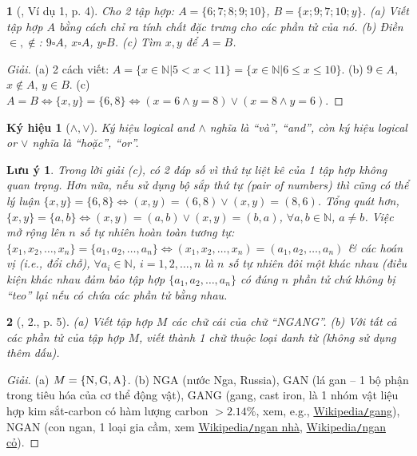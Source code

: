 \documentclass{article}
\newtheorem{baitoan}{}
\newtheorem{kyhieu}{Ký hiệu}
\newtheorem{luuy}{Lưu ý}
\begin{document}
\begin{baitoan}[\cite{Tuyen_Toan_6}, Ví dụ 1, p. 4]
	Cho 2 tập hợp: $A = \{6;7;8;9;10\}$, $B = \{x;9;7;10;y\}$. (a) Viết tập hợp $A$ bằng cách chỉ ra tính chất đặc trưng cho các phần tử của nó. (b) Điền $\in,\notin$: $9\square A$, $x\square A$, $y\square B$. (c) Tìm $x,y$ để $A = B$.
\end{baitoan}

\begin{proof}[Giải]
	(a) 2 cách viết: $A = \{x\in\mathbb{N}|5 < x < 11\} = \{x\in\mathbb{N}|6\le x\le10\}$. (b) $9\in A$, $x\notin A$, $y\in B$. (c) $A = B\Leftrightarrow\{x,y\} = \{6,8\}\Leftrightarrow(x = 6\land y = 8)\lor(x = 8\land y = 6)$.
\end{proof}

\begin{kyhieu}[$\land,\lor$]
	Ký hiệu logical and $\land$ nghĩa là ``và'', ``and'', còn ký hiệu logical or $\lor$ nghĩa là ``hoặc'', ``or''.
\end{kyhieu}

\begin{luuy}
	Trong lời giải (c), có 2 đáp số vì thứ tự liệt kê của 1 tập hợp không quan trọng. Hơn nữa, nếu sử dụng bộ sắp thứ tự (pair of numbers) thì cũng có thể lý luận $\{x,y\} = \{6,8\}\Leftrightarrow(x,y) = (6,8)\lor(x,y) = (8,6)$. Tổng quát hơn, $\{x,y\} = \{a,b\}\Leftrightarrow(x,y) = (a,b)\lor(x,y) = (b,a)$, $\forall a,b\in\mathbb{N}$, $a\ne b$. Việc mở rộng lên $n$ số tự nhiên hoàn toàn tương tự: $\{x_1,x_2,\ldots,x_n\} = \{a_1,a_2,\ldots,a_n\}\Leftrightarrow(x_1,x_2,\ldots,x_n) = (a_1,a_2,\ldots,a_n)$ \& các hoán vị (i.e., đổi chỗ), $\forall a_i\in\mathbb{N}$, $i = 1,2,\ldots,n$ là $n$ số tự nhiên đôi một khác nhau (điều kiện khác nhau đảm bảo tập hợp $\{a_1,a_2,\ldots,a_n\}$ có đúng $n$ phần tử chứ không bị ``teo'' lại nếu có chứa các phần tử bằng nhau.
\end{luuy}

\begin{baitoan}[\cite{Tuyen_Toan_6}, 2., p. 5]
	(a) Viết tập hợp $M$ các chữ cái của chữ ``NGANG''. (b) Với tất cả các phần tử của tập hợp $M$, viết thành 1 chữ thuộc loại danh từ (không sử dụng thêm dấu).
\end{baitoan}

\begin{proof}[Giải]
	(a) $M = \{{\rm N,G,A}\}$. (b) NGA (nước Nga, Russia), GAN (lá gan -- 1 bộ phận trong tiêu hóa của cơ thể động vật), GANG (gang, cast iron, là 1 nhóm vật liệu hợp kim sắt-carbon có hàm lượng carbon $> 2.14\%$, xem, e.g., \href{https://vi.wikipedia.org/wiki/Gang}{Wikipedia{\tt/}gang}), NGAN (con ngan, 1 loại gia cầm, xem \href{https://vi.wikipedia.org/wiki/Ngan_nh%C3%A0}{Wikipedia{\tt/}ngan nhà}, \href{https://vi.wikipedia.org/wiki/Ngan_c%E1%BB%8F}{Wikipedia{\tt/}ngan cỏ}).
\end{proof}
\end{document}
